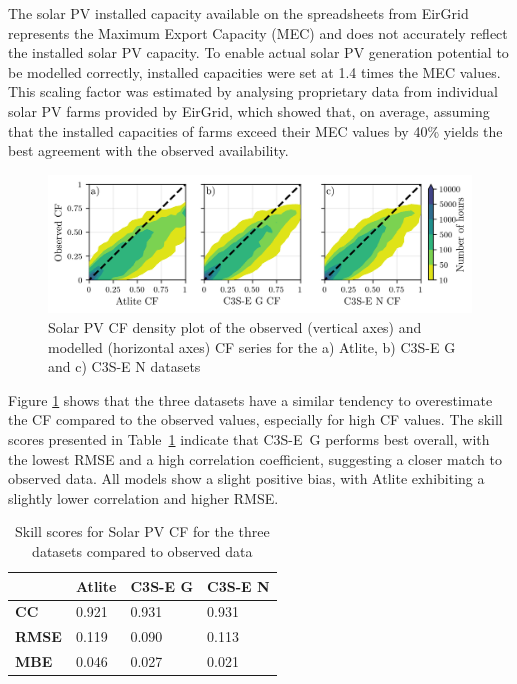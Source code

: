 \documentclass[preprint, 12pt]{elsarticle}
\begin{document}
The solar PV installed capacity available on the spreadsheets from EirGrid represents the Maximum Export Capacity (MEC) and does not accurately reflect the installed solar PV capacity. To enable actual solar PV generation potential to be modelled correctly, installed capacities were set at 1.4 times the MEC values. This scaling factor was estimated by analysing proprietary data from individual solar PV farms provided by EirGrid, which showed that, on average, assuming that the installed capacities of farms exceed their MEC values by 40\% yields the best agreement with the observed availability.

\begin{figure}[h!]
	\centering
	\includegraphics[width=\textwidth]{verification_pv_contour.png}
	\caption{Solar PV CF density plot of the observed (vertical axes) and modelled (horizontal axes) CF series for the a) Atlite, b) C3S-E G and c) C3S-E N datasets}	
	\label{fig:solar_verification_contour}
\end{figure}

Figure \ref{fig:solar_verification_contour} shows that the three datasets have a similar tendency to overestimate the CF compared to the observed values, especially for high CF values. The skill scores presented in Table~\ref{tab:pv_skill_scores} indicate that C3S-E~G performs best overall, with the lowest RMSE and a high correlation coefficient, suggesting a closer match to observed data. All models show a slight positive bias, with Atlite exhibiting a slightly lower correlation and higher RMSE.

\begin{table}[!ht]
	\centering
	\begin{tabular}{l|lll|}
		\cline{2-4}
		& \textbf{Atlite} & \textbf{C3S-E G} & \textbf{C3S-E N} \\ \hline
		\multicolumn{1}{|l|}{\textbf{CC}}   & 0.921           & 0.931            & 0.931            \\ \hline
		\multicolumn{1}{|l|}{\textbf{RMSE}} & 0.119           & 0.090            & 0.113            \\ \hline
		\multicolumn{1}{|l|}{\textbf{MBE}}   & 0.046           & 0.027           & 0.021           \\ \hline
	\end{tabular}
	\caption{Skill scores for Solar PV CF for the three datasets compared to observed data}
	\label{tab:pv_skill_scores}
\end{table}
\end{document}
